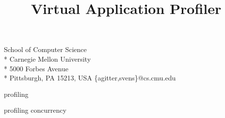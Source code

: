 \documentclass[natbib,10pt,preprint]{sigplanconf}
\begin{document}
\conferenceinfo{ }
\CopyrightYear{ }
\copyrightdata{ }



\title{Virtual Application Profiler}



           {School of Computer Science \\* Carnegie Mellon University  \\* 5000 Forbes Avenue \\* Pittsburgh, PA 15213, USA}
           {\{agitter,svens\}@cs.cmu.edu}


\maketitle




\terms
profiling

\keywords
profiling concurrency











\end{document}

